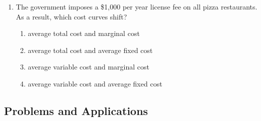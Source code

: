 \documentclass{article}
\begin{document}
\begin{enumerate}
\begin{enumerate}
	\item Average total cost will increase.
	
	\end{enumerate}
	
\item The government imposes a \$1,000 per year license fee on all pizza restaurants. As a result, which cost curves shift?

	\begin{enumerate}
	
	\item average total cost and marginal cost
	
	\item average total cost and average fixed cost
	
	\item average variable cost and marginal cost
	
	\item average variable cost and average fixed cost
	
	\end{enumerate}

\end{enumerate}

\subsection*{Problems and Applications}
\end{document}
